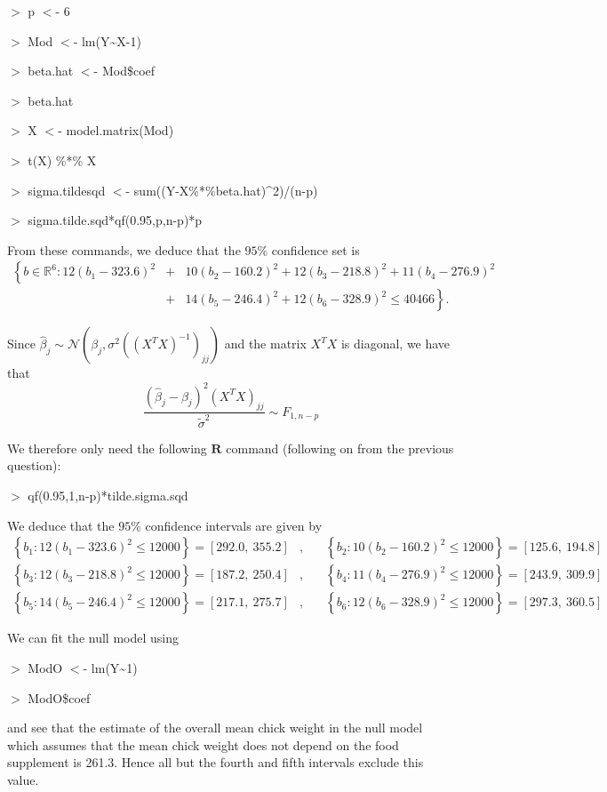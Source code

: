 $>$ p $<$- 6

$>$ Mod $<$- lm(Y\~{}X-1)

$>$ beta.hat $<$- Mod\$coef

$>$ beta.hat

$>$ X $<$- model.matrix(Mod)

$>$ t(X) \%*\% X

$>$ sigma.tildesqd $<$- sum((Y-X\%*\%beta.hat)\^{}2)/(n-p)

$>$ sigma.tilde.sqd*qf(0.95,p,n-p)*p

From these commands, we deduce that the $95\%$ confidence set is
\begin{eqnarray}
\left\{b\in\mathbb{R}^6: 12(b_1-323.6)^2 \right. & + & 10(b_2-160.2)^2 + 12(b_3-218.8)^2 + 11(b_4-276.9)^2\nonumber\\
& + & \left. 14(b_5-246.4)^2 + 12(b_6-328.9)^2 \leq 40466\right\}.
\end{eqnarray}

Since $\hat{\beta}_j \sim \mathcal{N}(\beta_j,\sigma^2((X^TX)^{-1})_{jj})$ and the matrix $X^TX$ is diagonal, we have that
\begin{equation}
\frac{\left(\hat{\beta}_j-\beta_j\right)^2(X^TX)_{jj}}{\tilde{\sigma}^2}\sim F_{1,n-p}
\end{equation}

We therefore only need the following $\mathbf{R}$ command (following on from the previous question):

$>$ qf(0.95,1,n-p)*tilde.sigma.sqd

We deduce that the $95\%$ confidence intervals are given by
\begin{eqnarray}
\left\{b_1: 12(b_1-323.6)^2 \leq 12000\right\} = [292.0,\ 355.2] & ,\quad & \left\{b_2: 10(b_2-160.2)^2 \leq 12000\right\} =  [125.6,\ 194.8] \nonumber\\
\left\{b_3: 12(b_3-218.8)^2 \leq 12000\right\} = [187.2,\ 250.4] & ,\quad & \left\{b_4: 11(b_4-276.9)^2 \leq 12000\right\} =  [243.9,\ 309.9] \nonumber\\
\left\{b_5: 14(b_5-246.4)^2 \leq 12000\right\} = [217.1,\ 275.7] & ,\quad & \left\{b_6: 12(b_6-328.9)^2 \leq 12000\right\} =  [297.3,\ 360.5]
\end{eqnarray}

We can fit the null model using

$>$ ModO $<$- lm(Y\~{}1)

$>$ ModO\$coef

and see that the estimate of the overall mean chick weight in the null model which assumes that the mean chick weight does not depend on the food supplement is 261.3. Hence all but the fourth and fifth intervals exclude this value.




